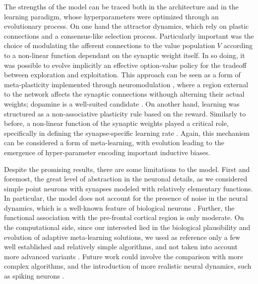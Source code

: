 The strengths of the model can be traced both in the architecture and in the learning paradigm, whose hyperparameters were optimized through an evolutionary process.
On one hand the attractor dynamics, which rely on plastic connections and a consensus-like selection process.
Particularly important was the choice of modulating the afferent connections to the value population $V$ according to a non-linear function dependant on the synaptic weight itself. In so doing, it was possible to evolve implicitly an effective option-value policy for the tradeoff between exploration and exploitation. 
This approach can be seen as a form of meta-plasticity implemented through neuromodulation \cite{wangMetalearningNaturalArtificial2021}, where a region external to the network affects the synaptic connections withough alterning their actual weights; dopamine is a well-suited candidate \cite{toblerAdaptiveCodingReward2005, roeschDopamineNeuronsEncode2007, coolsChemistryAdaptiveMind2019}.
On another hand, learning was structured as a non-associative plasticity rule based on the reward. Similarly to before, a non-linear function of the synaptic weights played a critical role, specifically in defining the synapse-specific learning rate \cite{larsenSynapsetypespecificPlasticityLocal2015}.
Again, this mechanism can be considered a form of meta-learning, with evolution leading to the emergence of hyper-parameter encoding important inductive biases.

Despite the promising results, there are some limitations to the model. First and foremost, the great level of abstraction in the neuronal details, as we considered simple point neurons with synapses modeled with relatively elementary functions.
In particular, the model does not account for the presence of noise in the neural dynamics, which is a well-known feature of biological neurons \cite{faisalNoiseNeuronsOther2012}.
Further, the functional association with the pre-frontal cortical region is only moderate.
On the computational side, since our interested lied in the biological plausibility and evolution of adaptive meta-learning solutions, we used as reference only a few well established and relatively simple algorithms, and not taken into account more advanced variants \cite{tokicAdaptiveEGreedyExploration2010, tokicValueDifferenceBasedExploration2011}.
Future work could involve the comparison with more complex algorithms, and the introduction of more realistic neural dynamics, such as spiking neurons \cite{nunesSpikingNeuralNetworks2022}.

